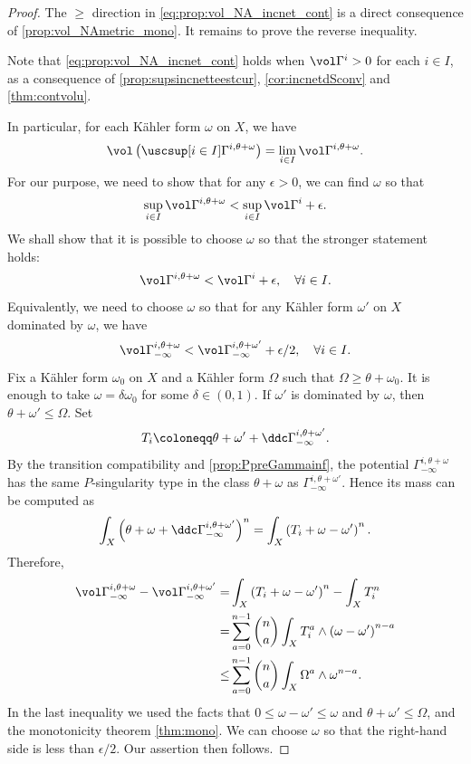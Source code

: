 \begin{proof}
    The $\geq$ direction in \eqref{eq:prop:vol_NA_incnet_cont} is a direct consequence of \cref{prop:vol_NAmetric_mono}. It remains to prove the reverse inequality.

    Note that \eqref{eq:prop:vol_NA_incnet_cont} holds when $\vol \Gamma^i>0$ for each $i\in I$, as a consequence of \cref{prop:supsincnetteestcur}, \cref{cor:incnetdSconv} and \cref{thm:contvolu}.

    In particular, for each Kähler form $\omega$ on $X$, we have
    \[
    \vol \left( \uscsup[i\in I] \Gamma^{i,\theta+\omega} \right)=\lim_{i\in I} \vol \Gamma^{i,\theta+\omega}.
    \]
    For our purpose, we need to show that for any $\epsilon>0$, we can find $\omega$ so that
    \[
    \sup_{i\in I} \vol \Gamma^{i,\theta+\omega}<\sup_{i\in I} \vol \Gamma^{i}+\epsilon.
    \]
    We shall show that it is possible to choose $\omega$ so that the stronger statement holds:
    \[
    \vol \Gamma^{i,\theta+\omega}<\vol \Gamma^{i}+\epsilon,\quad \forall i\in I.
    \]
    Equivalently, we need to choose $\omega$ so that for any Kähler form $\omega'$ on $X$ dominated by $\omega$, we have
    \[
    \vol \Gamma^{i,\theta+\omega}_{-\infty}<\vol \Gamma^{i,\theta+\omega'}_{-\infty}+\epsilon/2,\quad \forall i\in I.
    \]
    Fix a K\"ahler form $\omega_0$ on $X$ and a K\"ahler form $\Omega$ such that $\Omega\geq \theta+\omega_0$. It is enough to take $\omega=\delta\omega_0$ for some $\delta\in (0,1)$. If $\omega'$ is dominated by $\omega$, then $\theta+\omega'\leq \Omega$. Set
    \[
        T_i\coloneqq \theta+\omega'+\ddc \Gamma^{i,\theta+\omega'}_{-\infty}.
    \]
    By the transition compatibility and \cref{prop:PpreGammainf}, the potential $\Gamma^{i,\theta+\omega}_{-\infty}$ has the same $P$-singularity type in the class $\theta+\omega$ as $\Gamma^{i,\theta+\omega'}_{-\infty}$. Hence its mass can be computed as
    \[
        \int_X\left(\theta+\omega+\ddc\Gamma^{i,\theta+\omega'}_{-\infty}\right)^n=\int_X \left(T_i+\omega-\omega'\right)^n.
    \]
    Therefore,
    \[
    \begin{aligned}
    \vol \Gamma^{i,\theta+\omega}_{-\infty}-\vol \Gamma^{i,\theta+\omega'}_{-\infty}
    =&\int_X \left(T_i+\omega-\omega'\right)^n-\int_X T_i^n\\
    =& \sum_{a=0}^{n-1} \binom{n}{a} \int_X T_i^a\wedge \left( \omega-\omega'\right)^{n-a}\\
    \leq &\sum_{a=0}^{n-1} \binom{n}{a} \int_X \Omega^a\wedge \omega^{n-a}.
    \end{aligned}
    \]
    In the last inequality we used the facts that $0\leq \omega-\omega'\leq \omega$ and $\theta+\omega'\leq \Omega$, and the monotonicity theorem \cref{thm:mono}.
    We can choose $\omega$ so that the right-hand side is less than $\epsilon/2$. Our assertion then follows.
\end{proof}

